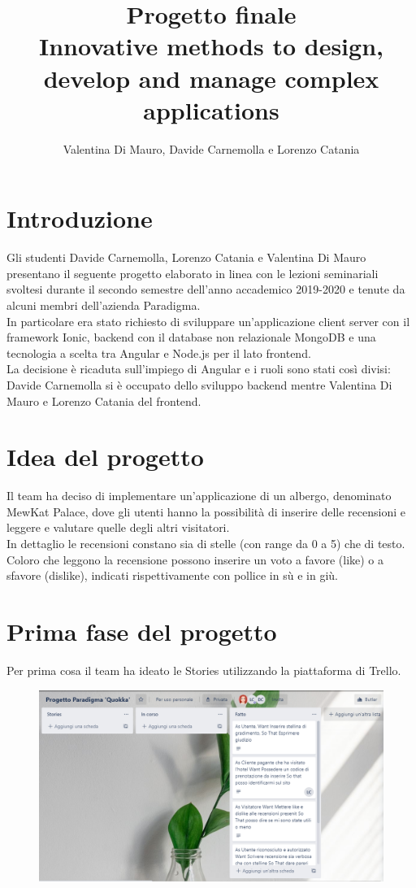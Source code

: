 \documentclass{article}[12pt]
\title{Progetto finale\\Innovative methods to design, develop and manage complex applications}
\author{Valentina Di Mauro, Davide Carnemolla e Lorenzo Catania}
\begin{document}
	\Huge\maketitle\pagebreak
	\section[Introduzione]{Introduzione}\huge{
	Gli studenti Davide Carnemolla, Lorenzo Catania e Valentina Di Mauro presentano il seguente progetto elaborato in linea con le lezioni seminariali svoltesi durante il secondo semestre dell'anno accademico 2019-2020 e tenute da alcuni membri dell'azienda Paradigma.\\ 
	In particolare era stato richiesto di sviluppare un'applicazione client server con il framework Ionic, backend con il database non relazionale MongoDB e una tecnologia a scelta tra Angular e Node.js per il lato frontend. \\La decisione è ricaduta sull'impiego di Angular e i ruoli sono stati così divisi: Davide Carnemolla si è occupato dello sviluppo backend mentre Valentina Di Mauro e Lorenzo Catania del frontend. 
	\section{Idea del progetto}{
	Il team ha deciso di implementare un'applicazione di un albergo, denominato MewKat Palace, dove gli utenti hanno la possibilità di inserire delle recensioni e leggere e valutare quelle degli altri visitatori. \\In dettaglio le recensioni constano sia di stelle (con range da 0 a 5) che di testo.
	Coloro che leggono la recensione possono inserire un voto a favore (like) o a sfavore (dislike), indicati rispettivamente con pollice in sù e in giù.
}
	\section{Prima fase del progetto}{
	Per prima cosa il team ha ideato le Stories utilizzando la piattaforma di Trello.\\ 
		
	\begin{figure}
		\includegraphics[width=\columnwidth]{img/storiapannello.png}
	\end{figure}
\break
	
}}
\end{document}
